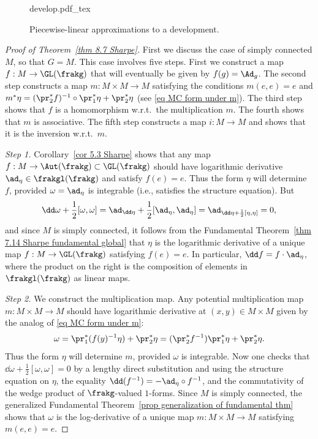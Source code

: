 \begin{figure}[tp]
    \def\svgwidth{0.5\linewidth}
    \centering
    {develop.pdf_tex}
    \caption{Piecewise-linear approximations to a development.\label{fig:develop}}
\end{figure}

\begin{proof}[Proof of Theorem~\ref{thm 8.7 Sharpe}]
    First we discuss the case of simply connected $M$, so that $G=M$. This case involves five steps. First we construct a map $f:M\to \GL(\frakg)$ that will eventually be given by $f(g)=\Ad_g$. The second step constructs a map $m:M\times M\to M$ satisfying the conditions $m(e,e)=e$ and $m^\ast \eta=(\pr_2^\ast f)^{-1} \circ \pr_1^\ast\eta+\pr_2^\ast\eta$ (see \eqref{eq MC form under m}). The third step shows that $f$ is a homomorphism w.r.t.\ the multiplication $m$. The fourth shows that $m$ is associative. The fifth step constructs a map $i:M\to M$ and shows that it is the inversion w.r.t.\ $m$.

    \emph{Step 1.} Corollary~\ref{cor 5.3 Sharpe} shows that any map $f:M\to \Aut(\frakg)\subset \GL(\frakg)$ should have logarithmic derivative $\ad_{\eta}\in \frakgl(\frakg)$ and satisfy $f(e)=e$. Thus the form $\eta$ will determine $f$, provided $\omega=\ad_\eta$ is integrable (i.e., satisfies the structure equation). But
    \[\dd\omega+\frac12[\omega,\omega]=\ad_{\dd\eta}+\frac12[\ad_\eta,\ad_\eta]=\ad_{\dd\eta+\frac12[\eta,\eta]}=0,\]
    and since $M$ is simply connected, it follows from the Fundamental Theorem~\ref{thm 7.14 Sharpe fundamental global} that $\eta$ is the logarithmic derivative of a unique map $f:M\to \GL(\frakg)$ satisfying $f(e)=e$. In particular, $\dd f=f\cdot \ad_\eta$, where the product on the right is the composition of elements in $\frakgl(\frakg)$ as linear maps.

    \emph{Step 2.} We construct the multiplication map. Any potential multiplication map $m:M\times M\to M$ should have logarithmic derivative at $(x,y)\in M\times M$ given by the analog of \eqref{eq MC form under m}:
    \[\omega=\pr_1^\ast (f(y)^{-1}\eta)+\pr_2^\ast\eta=(\pr_2^\ast f^{-1})\pr_1^\ast\eta+\pr_2^\ast\eta.\]
    Thus the form $\eta$ will determine $m$, provided $\omega$ is integrable. Now one checks that $\dd\omega+\frac12[\omega,\omega]=0$ by a lengthy direct substitution and using the structure equation on $\eta$, the equality $\dd (f^{-1})=-\ad_\eta\circ f^{-1}$, and the commutativity of the wedge product of $\frakg$-valued $1$-forms. Since $M$ is simply connected, the generalized Fundamental Theorem~\ref{prop generalization of fundamental thm} shows that $\omega$ is the log-derivative of a unique map $m:M\times M\to M$ satisfying $m(e,e)=e$.


\end{proof}
